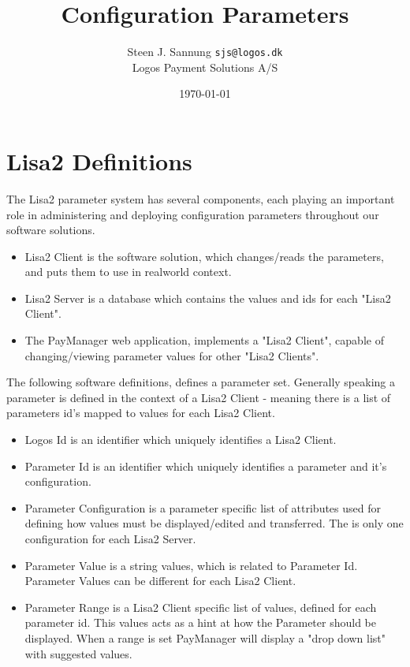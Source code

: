 \documentclass[a4paper,12pt]{article}
\begin{document}
\title{Configuration Parameters}
\author{Steen J. Sannung \texttt{sjs@logos.dk} \\
Logos Payment Solutions A/S }
\date{\today}

\maketitle

\section{}

\section{Lisa2 Definitions}

The Lisa2 parameter system has several components, each playing an important role in administering and deploying configuration parameters throughout our software solutions.
\begin{itemize}
\item Lisa2 Client is the software solution, which changes/reads the parameters, and puts them to use in realworld context. 
\item Lisa2 Server is a database which contains the values and ids for each "Lisa2 Client".
\item The PayManager web application, implements a "Lisa2 Client", capable of changing/viewing parameter values for other "Lisa2 Clients". 
\end{itemize}

The following software definitions, defines a parameter set. Generally speaking a parameter is defined in the context of a Lisa2 Client - 
meaning there is a list of parameters id's mapped to values for each Lisa2 Client.


\begin{itemize}
\item Logos Id is an identifier which uniquely identifies a Lisa2 Client. 
\item Parameter Id is an identifier which uniquely identifies a parameter and it's configuration.
\item Parameter Configuration is a parameter specific list of attributes used for defining how values must be displayed/edited and transferred. The is only one configuration for each Lisa2 Server.
\item Parameter Value is a string values, which is related to Parameter Id. Parameter Values can be different for each Lisa2 Client.
\item Parameter Range is a Lisa2 Client specific list of values, defined for each parameter id. This values acts as a hint at how the Parameter should be displayed. 
When a range is set PayManager will display a "drop down list" with suggested values.
\end{itemize}
\end{document}
